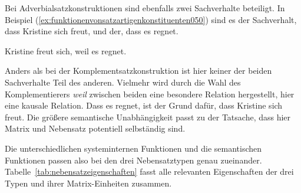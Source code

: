 Bei Adverbialsatzkonstruktionen sind ebenfalls zwei Sachverhalte beteiligt.
In Beispiel (\ref{ex:funktionenvonsatzartigenkonstituenten050}) sind es der Sachverhalt, dass Kristine sich freut, und der, dass es regnet.

\begin{exe}
  \ex\label{ex:funktionenvonsatzartigenkonstituenten050} Kristine freut sich, weil es regnet.
\end{exe}

Anders als bei der Komplementsatzkonstruktion ist hier keiner der beiden Sachverhalte Teil des anderen.
Vielmehr wird durch die Wahl des Komplementierers \textit{weil} zwischen beiden eine besondere Relation hergestellt, hier eine kausale Relation.
Dass es regnet, ist der Grund dafür, dass Kristine sich freut.
Die größere semantische Unabhängigkeit passt zu der Tatsache, dass hier Matrix und Nebensatz potentiell selbständig sind.

Die unterschiedlichen systeminternen Funktionen und die semantischen Funktionen passen also bei den drei Nebensatztypen genau zueinander.
Tabelle~\ref{tab:nebensatzeigenschaften} fasst alle relevanten Eigenschaften der drei Typen und ihrer Matrix-Einheiten zusammen.

\begin{table}
  \centering
  \caption{Eigenschaften der drei Typen von Nebensätzen und ihrer jeweiligen Matrix; zur syntaktischen Kategorie RS siehe Abschnitt~\ref{sec:relativsaetze}}
  \label{tab:nebensatzeigenschaften}
\end{table}

